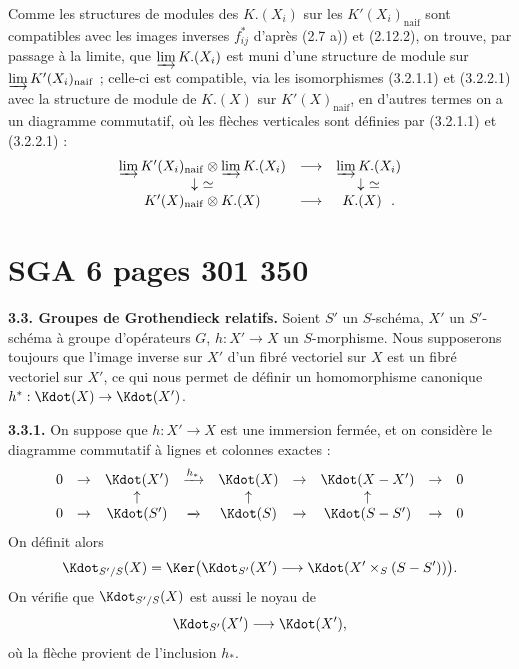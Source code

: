 Comme les structures de modules des $K.(X_i)$ sur les $K'(X_i)_{\mathrm{naif}}$ sont compatibles avec les images inverses $f_{ij}^*$ d'apr\`{e}s (2.7 a)) et (2.12.2), on trouve, par passage \`{a} la limite, que $\varinjlim K.(X_i)$ est muni d'une structure de module sur $\varinjlim K'(X_i)_{\mathrm{naif}}$ ; celle-ci est compatible, via les isomorphismes (3.2.1.1) et (3.2.2.1) avec la structure de module de $K.(X)$ sur $K'(X)_{\mathrm{naif}}$, en d'autres termes on a un diagramme commutatif, o\`{u} les fl\`{e}ches verticales sont d\'{e}finies par (3.2.1.1) et (3.2.2.1) :
\[
\begin{array}{ccc}
\varinjlim K'(X_i)_{\mathrm{naif}} \otimes \varinjlim K.(X_i) & \longrightarrow & \varinjlim K.(X_i) \\
\downarrow\ \simeq & & \downarrow\ \simeq \\
K'(X)_{\mathrm{naif}} \otimes K.(X) & \longrightarrow & K.(X)\ \ .
\end{array}
\]


\clearpage
{}
\section*{SGA 6 pages 301 350}
\setcounter{page}{301}

\noindent\textbf{3.3. Groupes de Grothendieck relatifs.} Soient $S'$ un $S$-sch\'ema, $X'$ un $S'$-sch\'ema \`a groupe d'op\'erateurs $G$, $h : X' \to X$ un $S$-morphisme. Nous supposerons toujours que l'image inverse sur $X'$ d'un fibr\'e vectoriel sur $X$ est un fibr\'e vectoriel sur $X'$, ce qui nous permet de d\'efinir un homomorphisme canonique $h^* : \Kdot(X) \to \Kdot(X')$.

\smallskip
\noindent\textbf{3.3.1.} On suppose que $h : X' \to X$ est une immersion ferm\'ee, et on consid\`ere le diagramme commutatif \`a lignes et colonnes exactes :
\[
\begin{array}{ccccccccc}
0 & \to & \Kdot(X') & \xrightarrow{h_*} & \Kdot(X) & \to & \Kdot(X - X') & \to & 0 \\
  &     & \uparrow        &                   & \uparrow        &     & \uparrow          &     &     \\
0 & \to & \Kdot(S') & \xrightarrow{} & \Kdot(S) & \to & \Kdot(S - S') & \to & 0 \\
\end{array}
\]
On d\'efinit alors
\[
\Kdot_{S'/S}(X) = \Ker\bigl(\Kdot_{S'}(X') \longrightarrow \Kdot(X' \times_S (S - S'))\bigr).
\]
On v\'erifie que $\Kdot_{S'/S}(X)$ est aussi le noyau de
\[
\Kdot_{S'}(X') \longrightarrow \Kdot(X'),
\]
o\`u la fl\`eche provient de l'inclusion $h_*$.

